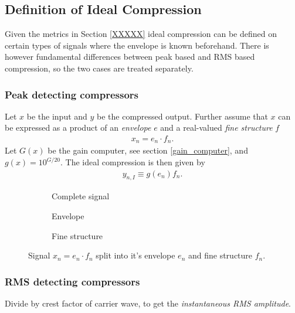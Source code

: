 \documentclass[../main2.tex]{subfiles}
\providecommand{\rootdir}{..}
\begin{document}
\FloatBarrier
\subsection{Definition of Ideal Compression} \label{method_ideal_compression}
Given the metrics in Section \ref{XXXXX} ideal compression can be defined on certain types of signals where the envelope is known beforehand. There is however fundamental differences between peak based and RMS based compression, so the two cases are treated separately.

\subsubsection{Peak detecting compressors}
Let $x$ be the input and $y$ be the compressed output. Further assume that $x$ can be expressed as a product of an \emph{envelope} $e$ and a real-valued \emph{fine structure} $f$ 
\begin{align}
x_n = e_n\cdot f_n.
\end{align}
Let $G(x)$ be the gain computer, see section \ref{gain_computer}, and $g(x) = 10^{G/20}$. The ideal compression is then given by
\begin{align}
y_{n,I} \equiv g(e_n) f_n. 
\end{align}


\begin{figure}
\captionsetup{justification=centering}
\begin{subfigure}{\linewidth}
\centering
\centerline{}
\caption{Complete signal}
\label{fig:signal_env_fine_struct}
\end{subfigure}
\par\bigskip
\begin{subfigure}{.5\linewidth}
\centering

\caption{Envelope}
\label{fig:signal_env}
\end{subfigure}
\begin{subfigure}{.5\linewidth}
\centering

\caption{Fine structure}
\label{fig:signal_fine_struct}
\end{subfigure}%
\caption{Signal $x_n = e_n\cdot f_n$ split into it's envelope $e_n$ and fine structure $f_n$.}
\label{fig:analytic_signal}
\end{figure}

\subsubsection{RMS detecting compressors}
Divide by crest factor of carrier wave, to get the \emph{instantaneous RMS amplitude}.
\end{document}
